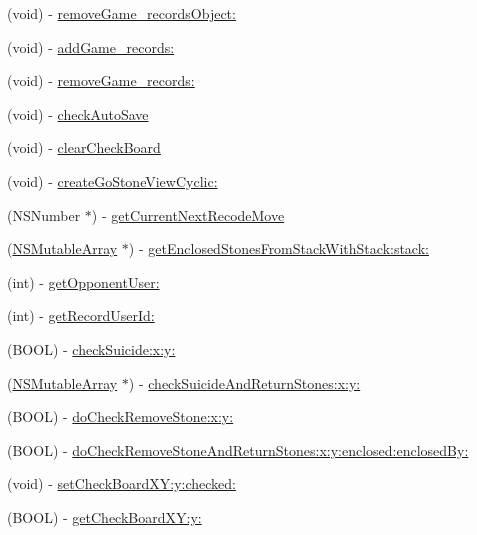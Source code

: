 \begin{DoxyCompactItemize}
\item 
(void) -\/ \hyperlink{interface_games_ac747f01b9449eac068cd3f400c75f4da}{removeGame\_\-recordsObject:}
\item 
(void) -\/ \hyperlink{interface_games_a728428abc6477a64e3af4fb03a67fc60}{addGame\_\-records:}
\item 
(void) -\/ \hyperlink{interface_games_a221f3c724f98ffa3f870d6f597750557}{removeGame\_\-records:}
\item 
(void) -\/ \hyperlink{interface_games_a4b748d245b2717e54d5581aaa851a9b5}{checkAutoSave}
\item 
(void) -\/ \hyperlink{interface_games_aede639ff391e10c3b864b2610155bd5e}{clearCheckBoard}
\item 
(void) -\/ \hyperlink{interface_games_a9bd21f92c54850bcb5b474602522376a}{createGoStoneViewCyclic:}
\item 
(NSNumber $\ast$) -\/ \hyperlink{interface_games_ad2d24effe36485105bde94171e77deb6}{getCurrentNextRecodeMove}
\item 
(\hyperlink{class_n_s_mutable_array}{NSMutableArray} $\ast$) -\/ \hyperlink{interface_games_a7eb3fe2c98bf87e30a85aa5312db2d99}{getEnclosedStonesFromStackWithStack:stack:}
\item 
(int) -\/ \hyperlink{interface_games_a47becd0c290f96ce3fd635a1d3c17af8}{getOpponentUser:}
\item 
(int) -\/ \hyperlink{interface_games_a0478be8859388476b846e6840b5abf26}{getRecordUserId:}
\item 
(BOOL) -\/ \hyperlink{interface_games_ab105dfc06c682a58a0bc9421425635a6}{checkSuicide:x:y:}
\item 
(\hyperlink{class_n_s_mutable_array}{NSMutableArray} $\ast$) -\/ \hyperlink{interface_games_abae461aa449e572d9706ff5837f0e3cd}{checkSuicideAndReturnStones:x:y:}
\item 
(BOOL) -\/ \hyperlink{interface_games_af9c158e6105d8a0afb05fde82d0faefb}{doCheckRemoveStone:x:y:}
\item 
(BOOL) -\/ \hyperlink{interface_games_a35a940a5a3b0c9176b35106d38779a04}{doCheckRemoveStoneAndReturnStones:x:y:enclosed:enclosedBy:}
\item 
(void) -\/ \hyperlink{interface_games_a97f53c5367df474c90fb9ff869627bfb}{setCheckBoardXY:y:checked:}
\item 
(BOOL) -\/ \hyperlink{interface_games_a2d9c4ec95804f78a087188b0ea7eef87}{getCheckBoardXY:y:}
\end{DoxyCompactItemize}
